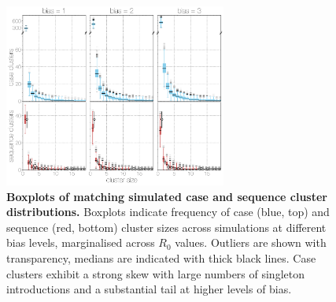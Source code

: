 \documentclass[9pt,lineno]{elife}
\begin{document}
\begin{figure}[h]
\centering
	\includegraphics[width=0.65\textwidth]{figures/mers_distributions.png}
	\caption{\textbf{Boxplots of matching simulated case and sequence cluster distributions.}
Boxplots indicate frequency of case (blue, top) and sequence (red, bottom) cluster sizes across simulations at different bias levels, marginalised across $R_{0}$ values.
Outliers are shown with transparency, medians are indicated with thick black lines.
Case clusters exhibit a strong skew with large numbers of singleton introductions and a substantial tail at higher levels of bias.
	}
	\label{cluster_distributions}
\end{figure}
\end{document}
